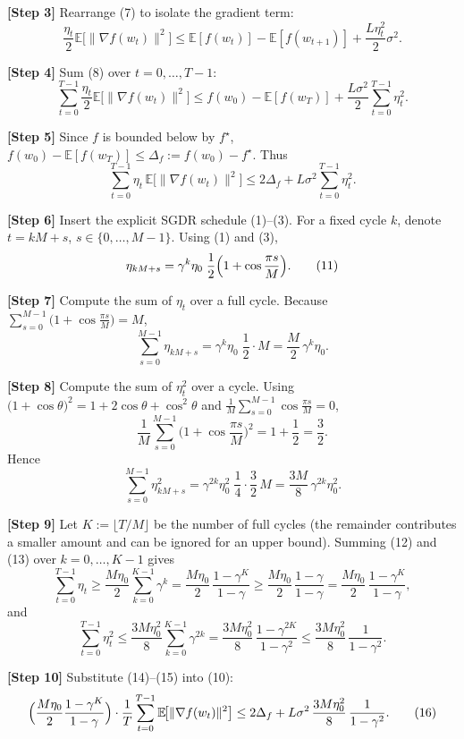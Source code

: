 \documentclass{article}
\newcommand{\E}{\mathbb{E}}
\begin{document}
\noindent\textbf{[Step 3]}  Rearrange (7) to isolate the gradient term:
\[
\frac{\eta_t}{2}\E\!\bigl[\|\nabla f(w_t)\|^{2}\bigr]
\le \E[f(w_t)]-\E[f(w_{t+1})]
+\frac{L\eta_t^{2}}{2}\sigma^{2}. \tag{8}
\]

\noindent\textbf{[Step 4]}  Sum (8) over $t=0,\dots,T-1$:
\[
\sum_{t=0}^{T-1}\frac{\eta_t}{2}\E\!\bigl[\|\nabla f(w_t)\|^{2}\bigr]
\le f(w_0)-\E[f(w_T)]+\frac{L\sigma^{2}}{2}\sum_{t=0}^{T-1}\eta_t^{2}. \tag{9}
\]

\noindent\textbf{[Step 5]}  Since $f$ is bounded below by $f^{\star}$,
$f(w_0)-\E[f(w_T)]\le \Delta_f:=f(w_0)-f^{\star}$.
Thus
\[
\sum_{t=0}^{T-1}\eta_t\,\E\!\bigl[\|\nabla f(w_t)\|^{2}\bigr]
\le 2\Delta_f
+L\sigma^{2}\sum_{t=0}^{T-1}\eta_t^{2}. \tag{10}
\]

\noindent\textbf{[Step 6]}  Insert the explicit SGDR schedule (1)–(3).  
For a fixed cycle $k$, denote $t=kM+s$, $s\in\{0,\dots,M-1\}$.
Using (1) and (3),
\[
\eta_{kM+s}= \gamma^{k}\eta_0\;\frac12\Bigl(1+\cos\frac{\pi s}{M}\Bigr). \tag{11}
\]

\noindent\textbf{[Step 7]}  Compute the sum of $\eta_t$ over a full cycle.
Because $\sum_{s=0}^{M-1}\bigl(1+\cos\frac{\pi s}{M}\bigr)=M$,
\[
\sum_{s=0}^{M-1}\eta_{kM+s}
= \gamma^{k}\eta_0\;\frac12\cdot M
= \frac{M}{2}\,\gamma^{k}\eta_0. \tag{12}
\]

\noindent\textbf{[Step 8]}  Compute the sum of $\eta_t^{2}$ over a cycle.
Using $\bigl(1+\cos\theta\bigr)^{2}=1+2\cos\theta+\cos^{2}\theta$
and $\frac{1}{M}\sum_{s=0}^{M-1}\cos\frac{\pi s}{M}=0$,
\[
\frac{1}{M}\sum_{s=0}^{M-1}\bigl(1+\cos\frac{\pi s}{M}\bigr)^{2}
=1+\frac12 =\frac32 .
\]
Hence
\[
\sum_{s=0}^{M-1}\eta_{kM+s}^{2}
= \gamma^{2k}\eta_0^{2}\;\frac14\cdot\frac32\,M
= \frac{3M}{8}\,\gamma^{2k}\eta_0^{2}. \tag{13}
\]

\noindent\textbf{[Step 9]}  Let $K:=\lfloor T/M\rfloor$ be the number of full
cycles (the remainder contributes a smaller amount and can be ignored for an
upper bound).  Summing (12) and (13) over $k=0,\dots,K-1$ gives
\[
\sum_{t=0}^{T-1}\eta_t
\ge \frac{M\eta_0}{2}\sum_{k=0}^{K-1}\gamma^{k}
= \frac{M\eta_0}{2}\,\frac{1-\gamma^{K}}{1-\gamma}
\ge \frac{M\eta_0}{2}\,\frac{1-\gamma}{1-\gamma}
= \frac{M\eta_0}{2}\,\frac{1-\gamma^{K}}{1-\gamma}, \tag{14}
\]
and
\[
\sum_{t=0}^{T-1}\eta_t^{2}
\le \frac{3M\eta_0^{2}}{8}\sum_{k=0}^{K-1}\gamma^{2k}
= \frac{3M\eta_0^{2}}{8}\,\frac{1-\gamma^{2K}}{1-\gamma^{2}}
\le \frac{3M\eta_0^{2}}{8}\,\frac{1}{1-\gamma^{2}} . \tag{15}
\]

\noindent\textbf{[Step 10]}  Substitute (14)–(15) into (10):
\[
\Bigl(\frac{M\eta_0}{2}\frac{1-\gamma^{K}}{1-\gamma}\Bigr)
\cdot\frac{1}{T}\sum_{t=0}^{T-1}\E\!\bigl[\|\nabla f(w_t)\|^{2}\bigr]
\le 2\Delta_f
+L\sigma^{2}\,\frac{3M\eta_0^{2}}{8}\,\frac{1}{1-\gamma^{2}} . \tag{16}
\]
\end{document}
